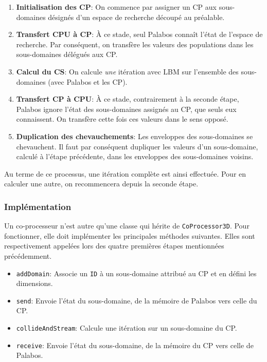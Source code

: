\begin{enumerate}
\item \textbf{Initialisation des \ac{CP}}: On commence par assigner un \ac{CP} aux sous-domaines désignés d'un espace de recherche découpé au préalable.
\item \textbf{Transfert \acs{CPU} à \ac{CP}}: À ce stade, seul Palabos connaît l'état de l'espace de recherche. Par conséquent, on transfère les valeurs des populations dans les sous-domaines délégués aux \ac{CP}.
\item \textbf{Calcul du \ac{CS}}: On calcule \textit{une} itération avec \ac{LBM}  sur l'ensemble des sous-domaines (avec Palabos et les \ac{CP}).
\item \textbf{Transfert \ac{CP} à \acs{CPU}}: À ce stade, contrairement à la seconde étape, Palabos ignore l'état des sous-domaines assignés au \ac{CP}, que seuls eux connaissent. On transfère cette fois ces valeurs dans le sens opposé.
\item \textbf{Duplication des chevauchements}:  Les enveloppes des sous-domaines se chevauchent. Il faut par conséquent dupliquer les valeurs d'un sous-domaine, calculé à l'étape précédente, dans les enveloppes des sous-domaines voisins.
\end{enumerate}

Au terme de ce processus, une itération complète est ainsi effectuée. Pour en calculer une autre, on recommencera depuis la seconde étape. 

\subsubsection{Implémentation}
Un co-processeur n'est autre qu'une classe qui hérite de \texttt{CoProcessor3D}. Pour fonctionner, elle doit implémenter les principales méthodes suivantes. Elles sont respectivement appelées lors des quatre premières étapes mentionnées précédemment.

\begin{itemize}
\item \texttt{addDomain}: Associe un \texttt{ID} à un sous-domaine attribué au \ac{CP} et en défini les dimensions.
\item \texttt{send}: Envoie l'état du sous-domaine, de la mémoire de Palabos vers celle du \ac{CP}.
\item \texttt{collideAndStream}: Calcule une itération sur un sous-domaine du \ac{CP}.
\item \texttt{receive}: Envoie l'état du sous-domaine, de la mémoire du \ac{CP} vers celle de Palabos.
\end{itemize}

